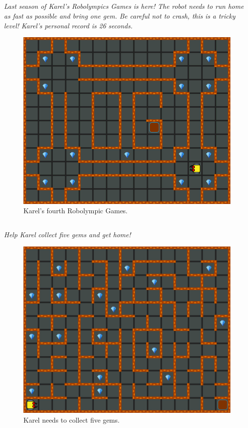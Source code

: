 \documentclass[article,A4,12pt]{llncs}
\begin{document}
\subsection{}

{\em Last season of Karel's Robolympics Games is here! The 
robot needs to run home as fast as possible and bring one gem. 
Be careful not to crash, this is a tricky level! Karel's personal record is 26 seconds.}

\begin{figure}[!ht]
\begin{center}
\includegraphics[height=0.4\textwidth]{imgk/a08.png}
\end{center}
\vspace{-4mm}
\caption{Karel's fourth Robolympic Games.}
\label{fig:a08}
\vspace{-4mm}
\end{figure}
\noindent

\subsection{}

{\em​Help Karel collect five gems and get home!}

\begin{figure}[!ht]
\begin{center}
\includegraphics[height=0.4\textwidth]{imgk/a09.png}
\end{center}
\vspace{-4mm}
\caption{Karel needs to collect five gems.}
\label{fig:a09}
\vspace{-4mm}
\end{figure}
\noindent
\end{document}
